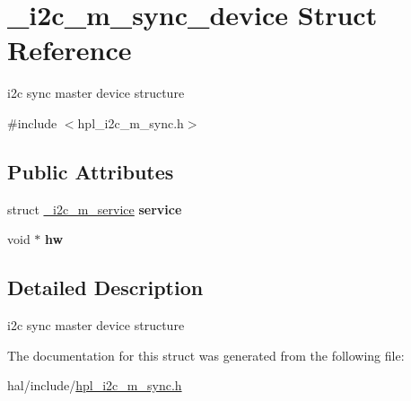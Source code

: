 \hypertarget{struct__i2c__m__sync__device}{}\section{\+\_\+i2c\+\_\+m\+\_\+sync\+\_\+device Struct Reference}
\label{struct__i2c__m__sync__device}


i2c sync master device structure  




{\ttfamily \#include $<$hpl\+\_\+i2c\+\_\+m\+\_\+sync.\+h$>$}

\subsection*{Public Attributes}
\begin{DoxyCompactItemize}
\item 
\mbox{\label{struct__i2c__m__sync__device_aa24353cae7709277f126a3b2d274ed21}} 
struct \hyperlink{struct__i2c__m__service}{\+\_\+i2c\+\_\+m\+\_\+service} {\bfseries service}
\item 
\mbox{\label{struct__i2c__m__sync__device_afb0ce1288a1c4759a360e58069a4120a}} 
void $\ast$ {\bfseries hw}
\end{DoxyCompactItemize}


\subsection{Detailed Description}
i2c sync master device structure 

The documentation for this struct was generated from the following file\+:\begin{DoxyCompactItemize}
\item 
hal/include/\hyperlink{hpl__i2c__m__sync_8h}{hpl\+\_\+i2c\+\_\+m\+\_\+sync.\+h}\end{DoxyCompactItemize}
